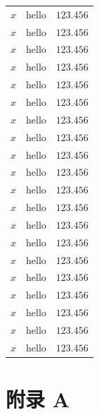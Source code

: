 \documentclass[zihao=5, UTF8]{article}
\theoremstyle{MyLineTheoremStyle} %
\theoremstyle{MyBlockTheoremStyle} %
\theoremstyle{MySubsubsectionStyle} %
\begin{document}
\begin{longtable}[c]{ccc}
     $x$ & hello  & $123.456$ \\
     $x$ & hello  & $123.456$ \\
     $x$ & hello  & $123.456$ \\
     $x$ & hello  & $123.456$ \\
     $x$ & hello  & $123.456$ \\
     $x$ & hello  & $123.456$ \\
     $x$ & hello  & $123.456$ \\
     $x$ & hello  & $123.456$ \\
     $x$ & hello  & $123.456$ \\
     $x$ & hello  & $123.456$ \\
     $x$ & hello  & $123.456$ \\
     $x$ & hello  & $123.456$ \\
     $x$ & hello  & $123.456$ \\
     $x$ & hello  & $123.456$ \\
     $x$ & hello  & $123.456$ \\
     $x$ & hello  & $123.456$ \\
     $x$ & hello  & $123.456$ \\
     $x$ & hello  & $123.456$ \\
     $x$ & hello  & $123.456$ \\
     $x$ & hello  & $123.456$ \\* \bottomrule
\end{longtable}


\nocite{*}

\thispagestyle{fancy} 




\newpage
\appendix
\titleformat{\section}{\large\centering\bfseries}{\thesection}{1em}{}
\titleformat{\subsection}{\large\centering\bfseries}{\thesubsection}{1em}{}

\section*{\huge\centering\bfseries 附录 A}\setcounter{subsection}{0}\renewcommand{}
\end{document}
